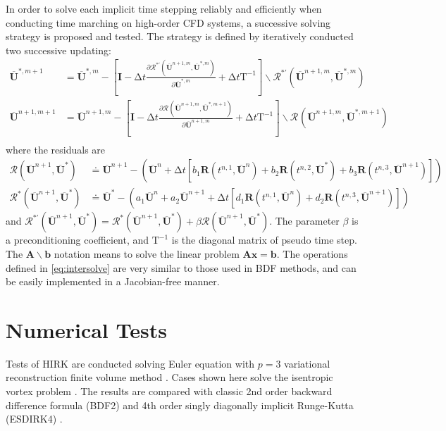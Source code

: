 \documentclass[10pt]{article}
\newcommand{\uu}{\overline{\mathbf{U}}}
\newcommand{\R}{\mathbf{R}}
\newcommand{\inc}{\mathrm\Delta}
\newcommand{\Tau}{\mathrm{T}}
\newcommand{\Res}{\mathcal{R}}
\newcommand{\eye}{\mathbf{I}}
\begin{document}
In order to solve each implicit time stepping reliably and efficiently
when conducting time marching on high-order CFD systems,
a successive solving strategy is proposed and tested.
The strategy is defined by iteratively conducted two
successive updating:
\begin{equation}
  \label{eq:intersolve}
  \begin{aligned}
    \uu^{*,m+1}   & = \uu^{*,m} - \left[
      \eye - \inc t \frac{\partial \Res^{*'}(\uu^{n+1,m},\uu^{*,m})}
      {\partial \uu^{*,m}}
      + \inc t \Tau^{-1}
      \right]
    \backslash \Res^{*'}(\uu^{n+1,m},\uu^{*,m}) \\
    \uu^{n+1,m+1} & = \uu^{n+1,m} - \left[
      \eye - \inc t \frac{\partial \Res^{}(\uu^{n+1,m},\uu^{*,m+1})}
      {\partial \uu^{n+1,m}}
      + \inc t \Tau^{-1}
      \right]
    \backslash \Res^{}(\uu^{n+1,m},\uu^{*,m+1}) \\
  \end{aligned}
\end{equation}
where the residuals are
\begin{equation}
  \begin{aligned}
    \Res(\uu^{n+1},\uu^{*})   & \doteq \uu^{n+1} - \left(
    \uu^{n} +
    \inc t
    \left[
      b_1\R(t^{n,1}, \uu^n) +
      b_2\R(t^{n,2}, \uu^*) +
      b_3\R(t^{n,3}, \uu^{n+1})
      \right]
    \right)                                               \\
    \Res^*(\uu^{n+1},\uu^{*}) & \doteq\uu^{*} - \left(
    a_1\uu^{n} +
    a_2\uu^{n+1} +
    \inc t
    \left[
      d_1\R(t^{n,1}, \uu^n) +
      d_2\R(t^{n,3}, \uu^{n+1})
      \right]
    \right)
  \end{aligned}
\end{equation}
and
\(
  \Res^{*'}(\uu^{n+1},\uu^{*}) = \Res^*(\uu^{n+1},\uu^{*}) + \beta\Res(\uu^{n+1},\uu^{*})
\).
The parameter $\beta$ is a preconditioning coefficient,
and $\Tau^{-1}$ is the diagonal matrix of pseudo time step.
The $\mathbf{A}\backslash \mathbf{b}$
notation means to solve the linear problem $\mathbf{A}\mathbf{x}=\mathbf{b}$.
The operations defined in \eqref{eq:intersolve}
are very similar to those used in BDF methods, and can be easily implemented
in a Jacobian-free manner.

\section{Numerical Tests}

Tests of HIRK are conducted solving Euler equation with $p=3$ variational
reconstruction finite volume method \cite{wang2017compact_VR}.
Cases shown here solve the isentropic vortex problem \cite{hu1999weighted_WENO}.
The results are compared with classic 2nd order backward difference formula (BDF2)
and 4th order singly diagonally implicit Runge-Kutta (ESDIRK4) \cite{kennedy2003additiveARK}.
\end{document}
